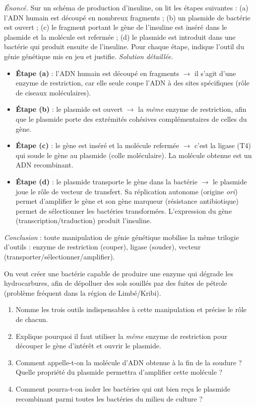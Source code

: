 \documentclass[11pt]{article}
\newcommand{\cle}[1]{{\popxbold\color{popdark}#1}}
\begin{document}
\begin{exoresolu}
\emph{Énoncé.} Sur un schéma de production d'insuline, on lit les étapes suivantes : (a) l'ADN humain est découpé en nombreux fragments ; (b) un plasmide de bactérie est ouvert ; (c) le fragment portant le gène de l'insuline est inséré dans le plasmide et la molécule est refermée ; (d) le plasmide est introduit dans une bactérie qui produit ensuite de l'insuline. Pour chaque étape, indique l'outil du génie génétique mis en jeu et justifie.
\tcblower
\emph{Solution détaillée.}
\begin{itemize}
\item \textbf{Étape (a)} : l'ADN humain est découpé en fragments $\to$ il s'agit d'une \cle{enzyme de restriction}, car elle seule coupe l'ADN à des sites spécifiques (rôle de ciseaux moléculaires).
\item \textbf{Étape (b)} : le plasmide est ouvert $\to$ la \emph{même} enzyme de restriction, afin que le plasmide porte des extrémités cohésives complémentaires de celles du gène.
\item \textbf{Étape (c)} : le gène est inséré et la molécule refermée $\to$ c'est la \cle{ligase} (T4) qui soude le gène au plasmide (colle moléculaire). La molécule obtenue est un \cle{ADN recombinant}.
\item \textbf{Étape (d)} : le plasmide transporte le gène dans la bactérie $\to$ le plasmide joue le rôle de \cle{vecteur de transfert}. Sa réplication autonome (origine \emph{ori}) permet d'amplifier le gène et son gène marqueur (résistance antibiotique) permet de sélectionner les bactéries transformées. L'expression du gène (transcription/traduction) produit l'insuline.
\end{itemize}
\emph{Conclusion} : toute manipulation de génie génétique mobilise la même trilogie d'outils : enzyme de restriction (couper), ligase (souder), vecteur (transporter/sélectionner/amplifier).
\end{exoresolu}

\begin{exercice}
On veut créer une bactérie capable de produire une enzyme qui dégrade les hydrocarbures, afin de dépolluer des sols souillés par des fuites de pétrole (problème fréquent dans la région de Limbé/Kribi). 
\begin{enumerate}
\item Nomme les trois outils indispensables à cette manipulation et précise le rôle de chacun.
\item Explique pourquoi il faut utiliser la \emph{même} enzyme de restriction pour découper le gène d'intérêt et ouvrir le plasmide.
\item Comment appelle-t-on la molécule d'ADN obtenue à la fin de la soudure ? Quelle propriété du plasmide permettra d'amplifier cette molécule ?
\item Comment pourra-t-on isoler les bactéries qui ont bien reçu le plasmide recombinant parmi toutes les bactéries du milieu de culture ?
\end{enumerate}
\end{exercice}
\end{document}
